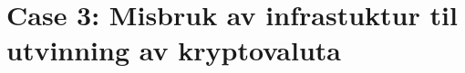 \section{Case 3: Misbruk av infrastuktur til utvinning av kryptovaluta}
\label{sec:Misbruk av infrastuktur til utvinning av kryptovaluta}

